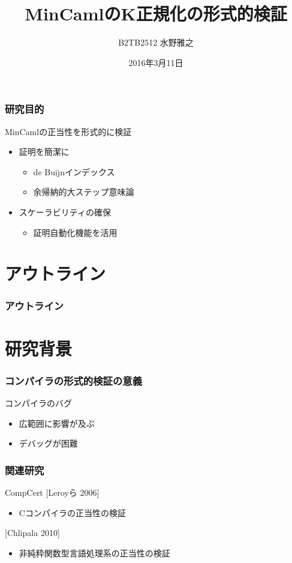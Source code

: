 \documentclass[dvipdfmx,cjk,xcolor=dvipsnames,envcountsect,notheorems,12pt]{beamer}
\title{MinCamlのK正規化の形式的検証}
\author{B2TB2512 水野雅之}
\institute[東北大学　住井・松田研]{工学部　情報知能システム総合学科\\住井・松田研究室}%
\date{2016年3月11日}
\theoremstyle{definition}
\begin{document}
\frame[plain]{\titlepage}%

\begin{frame}
	\frametitle{研究目的}
	\LARGE MinCamlの正当性を形式的に検証
	\begin{itemize}
		\item 証明を簡潔に
			\begin{itemize}
				\item de Buijnインデックス
				\item 余帰納的大ステップ意味論
			\end{itemize}
		\item スケーラビリティの確保
			\begin{itemize}
				\item 証明自動化機能を活用
			\end{itemize}
	\end{itemize}
\end{frame}

\section*{アウトライン}

\begin{frame}
  \frametitle{アウトライン}
  \tableofcontents[sectionstyle=show,subsectionstyle=hide]
\end{frame}

\section{研究背景}

\begin{frame}
	\frametitle{コンパイラの形式的検証の意義}
	\LARGE コンパイラのバグ
	\begin{itemize}
		\item 広範囲に影響が及ぶ
		\item デバッグが困難
	\end{itemize}
\end{frame}

\begin{frame}
	\frametitle{関連研究}
	\LARGE CompCert [Leroyら 2006]
	\begin{itemize}
		\item Cコンパイラの正当性の検証
	\end{itemize}

	[Chlipala 2010]
	\begin{itemize}
		\item 非純粋関数型言語処理系の正当性の検証
	\end{itemize}
\end{frame}
\end{document}
